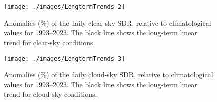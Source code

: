 \documentclass[applsci,article,accept,moreauthors,pdftex]{Definitions/mdpi}
\begin{document}
%

%
%
%
%



\appendixstart
\appendix
\section[\appendixname~\thesection]{}

\label{app1}


\begin{figure}[H]
    {
        \texttt{[image: ./images/LongtermTrends-2]}

    }
    \caption{Anomalies (\%) of the daily clear-sky SDR, relative to climatological values for 1993--2023. The black line shows the long-term linear trend for clear-sky conditions.}\label{fig:trendCLEAR}
\end{figure}



\begin{figure}[H]
    {
        \texttt{[image: ./images/LongtermTrends-3]}

    }
    \caption{Anomalies (\%) of the daily cloud-sky SDR, relative to climatological values for 1993--2023. The black line shows the long-term linear trend for cloud-sky conditions.}\label{fig:trendCLOUD}
\end{figure}
\end{document}

